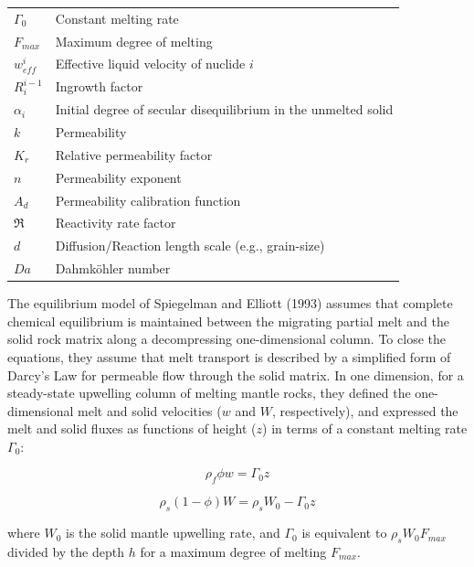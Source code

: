 \documentclass[draft]{agujournal2019}
\begin{document}
\begin{table}[H]
\begin{tabular}{l | l}
$\Gamma_0$ & Constant melting rate \\
$F_{max}$ & Maximum degree of melting \\
$w_{eff}^{i}$ & Effective liquid velocity of nuclide $i$ \\
$R_i^{i-1}$ & Ingrowth factor \\
$\alpha_i$ & Initial degree of secular disequilibrium in the unmelted solid \\
$k$ & Permeability \\
$K_r$ & Relative permeability factor \\
$n$ & Permeability exponent \\
$A_d$ & Permeability calibration function \\
$\Re$ & Reactivity rate factor \\
$d$ & Diffusion/Reaction length scale (e.g., grain-size) \\
$Da$ & Dahmköhler number \\
\hline
\end{tabular}
\end{table}


The equilibrium model of Spiegelman and Elliott (1993) assumes that complete chemical equilibrium is maintained between the migrating partial melt and the solid rock matrix along a decompressing one-dimensional column. To close the equations, they assume that melt transport is described by a simplified form of Darcy’s Law for permeable flow through the solid matrix. In one dimension, for a steady-state upwelling column of melting mantle rocks, they defined the one-dimensional melt and solid velocities ($w$ and $W$, respectively), and expressed the melt and solid fluxes as functions of height ($z$) in terms of a constant melting rate $\Gamma_0$:

\begin{linenomath*}
\begin{equation}
    \rho_f \phi w = \Gamma_0 z\label{eq:2}
\end{equation}
\end{linenomath*}

\begin{linenomath*}
\begin{equation}
    \rho_s (1 - \phi) W = \rho_s W_0 - \Gamma_0 z\label{eq:3}
\end{equation}
\end{linenomath*}

where $W_0$ is the solid mantle upwelling rate, and $\Gamma_0$ is equivalent to $\rho_s W_0 F_{max}$ divided by the depth $h$ for a maximum degree of melting $F_{max}$.
\end{document}
